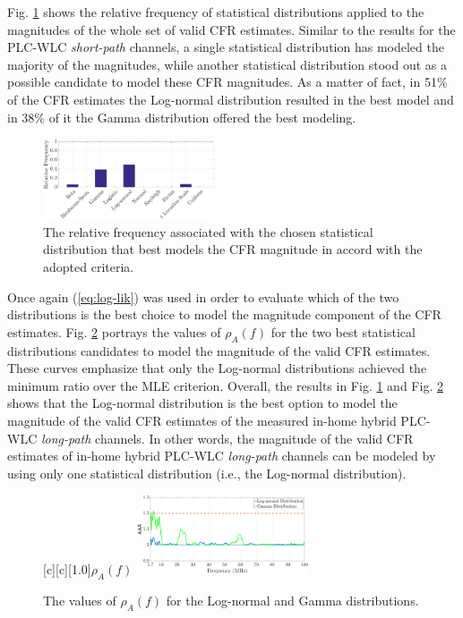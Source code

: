 \documentclass[journal]{IEEEtran}
\begin{document}
Fig. \ref{MAG_percentlW} shows the relative frequency of statistical distributions applied to the magnitudes of the whole set of valid \ac{CFR} estimates. Similar to the results for the \ac{PLC}-\ac{WLC} \textit{short-path} channels, a single statistical distribution has modeled the majority of the magnitudes, while another statistical distribution stood out as a possible candidate to model these \ac{CFR} magnitudes. As a matter of fact, in 51\% of the \ac{CFR} estimates the Log-normal distribution resulted in the best model and in 38\% of it the Gamma distribution offered the best modeling. 

\begin{figure}[h!]
	\centering
	\includegraphics[width=0.45\textwidth]{images/Mag_percentlW.eps}
	\caption{The relative frequency associated with the chosen statistical distribution that best models the CFR magnitude in accord with the adopted criteria.}
	\label{MAG_percentlW}
\end{figure}

Once again (\ref{eq:log-lik}) was used in order to evaluate which of the two distributions is the best choice to model the magnitude component of the \ac{CFR} estimates. Fig. \ref{fig:Log_likelW} portrays the values of  $\rho_{A}(f)$ for the two best statistical distributions candidates to model the magnitude of the valid \ac{CFR} estimates. These curves emphasize that only the Log-normal distributions achieved the minimum ratio over the \ac{MLE} criterion. Overall, the results in Fig. \ref{MAG_percentlW} and Fig. \ref{fig:Log_likelW} shows that the Log-normal distribution is the best option to model the magnitude of the valid \ac{CFR} estimates of the measured in-home hybrid \ac{PLC}-\ac{WLC} \textit{long-path} channels. In other words, the magnitude of the valid \ac{CFR} estimates of in-home hybrid \ac{PLC}-\ac{WLC} \textit{long-path} channels can be modeled by using only one statistical distribution (i.e., the Log-normal distribution).

\begin{figure}[h!]
	\centering
	[c][1.0]{$\rho_{A} (f)$}
	\includegraphics[width=0.45\textwidth]{images/Log_Lognormal_GammalW.eps}
	\caption{The values of $\rho_{A} (f)$ for the Log-normal and Gamma distributions.}
	\label{fig:Log_likelW}
\end{figure}
\end{document}
